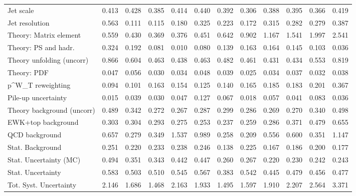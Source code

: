 \begin{tabular}{l|p{0.6cm}p{0.6cm}p{0.6cm}p{0.6cm}p{0.6cm}p{0.6cm}p{0.6cm}p{0.6cm}p{0.6cm}p{0.6cm}p{0.6cm}}
Jet scale                                & 0.413 & 0.428 & 0.385 & 0.414 & 0.440 & 0.392 & 0.306 & 0.388 & 0.395 & 0.366 & 0.419 \\
Jet resolution                           & 0.563 & 0.111 & 0.115 & 0.180 & 0.325 & 0.223 & 0.172 & 0.315 & 0.282 & 0.279 & 0.387 \\
Theory: Matrix element                   & 0.559 & 0.430 & 0.369 & 0.376 & 0.451 & 0.642 & 0.902 & 1.167 & 1.541 & 1.997 & 2.541 \\
Theory: PS and hadr.                     & 0.324 & 0.192 & 0.081 & 0.010 & 0.080 & 0.139 & 0.163 & 0.164 & 0.145 & 0.103 & 0.036 \\
Theory unfolding (uncorr)                & 0.866 & 0.604 & 0.463 & 0.438 & 0.463 & 0.482 & 0.461 & 0.431 & 0.434 & 0.553 & 0.819 \\
Theory: PDF                              & 0.047 & 0.056 & 0.030 & 0.034 & 0.048 & 0.039 & 0.025 & 0.034 & 0.037 & 0.032 & 0.038 \\
p^{W}_{T} reweighting                    & 0.094 & 0.101 & 0.163 & 0.154 & 0.125 & 0.140 & 0.165 & 0.185 & 0.183 & 0.201 & 0.367 \\
Pile-up uncertainty                      & 0.015 & 0.039 & 0.030 & 0.047 & 0.127 & 0.067 & 0.018 & 0.057 & 0.041 & 0.083 & 0.036 \\
Theory background (uncorr)               & 0.489 & 0.342 & 0.272 & 0.267 & 0.287 & 0.299 & 0.286 & 0.269 & 0.270 & 0.340 & 0.498 \\
EWK+top background                       & 0.303 & 0.304 & 0.293 & 0.275 & 0.253 & 0.237 & 0.259 & 0.286 & 0.371 & 0.479 & 0.655 \\
QCD background                           & 0.657 & 0.279 & 0.349 & 1.537 & 0.989 & 0.258 & 0.209 & 0.556 & 0.600 & 0.351 & 1.147 \\
Stat. Background                         & 0.251 & 0.220 & 0.233 & 0.238 & 0.246 & 0.138 & 0.225 & 0.167 & 0.186 & 0.200 & 0.177 \\
Stat. Uncertainty (MC)                   & 0.494 & 0.351 & 0.343 & 0.442 & 0.447 & 0.260 & 0.267 & 0.220 & 0.230 & 0.242 & 0.243 \\
\hline
Stat. Uncertainty                        & 0.583 & 0.503 & 0.510 & 0.545 & 0.567 & 0.383 & 0.542 & 0.445 & 0.479 & 0.456 & 0.477 \\
\hline
Tot. Syst. Uncertainty                   & 2.146 & 1.686 & 1.468 & 2.163 & 1.933 & 1.495 & 1.597 & 1.910 & 2.207 & 2.564 & 3.371 \\
\hline
\end{tabular}
